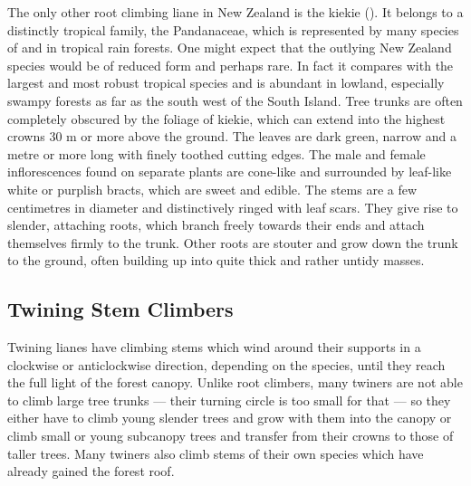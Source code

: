 The only other root climbing liane in New Zealand is the kiekie ().
It belongs to a distinctly tropical family, the Pandanaceae, which is represented by many species of  and  in tropical rain forests.
One might expect that the outlying New Zealand species would be of reduced form and perhaps rare.
In fact it compares with the largest and most robust tropical species and is abundant in lowland, especially swampy forests as far as the south west of the South Island.
Tree trunks are often completely obscured by the foliage of kiekie, which can extend into the highest crowns 30 m or more above the ground.
The leaves are dark green, narrow and a metre or more long with finely toothed cutting edges.
The male and female inflorescences found on separate plants are cone-like and surrounded by leaf-like white or purplish bracts, which are sweet and edible.
The stems are a few centimetres in diameter and distinctively ringed with leaf scars.
They give rise to slender, attaching roots, which branch freely towards their ends and attach themselves firmly to the trunk.
Other roots are stouter and grow down the trunk to the ground, often building up into quite thick and rather untidy masses.

\subsection{Twining Stem Climbers}

Twining lianes have climbing stems which wind around their supports in a clockwise or anticlockwise direction, depending on the species, until they reach the full light of the forest canopy.
Unlike root climbers, many twiners are not able to climb large tree trunks — their turning circle is too small for that — so they either have to climb young slender trees and grow with them into the canopy or climb small or young subcanopy trees and transfer from their crowns to those of taller trees.
Many twiners also climb stems of their own species which have already gained the forest roof.

